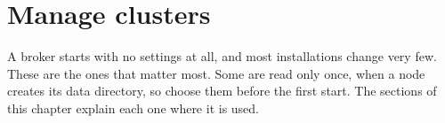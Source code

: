 
\chapter{Manage clusters}

A broker starts with no settings at all, and most installations change very few. These are the
ones that matter most. Some are read only once, when a node creates its data directory, so choose
them before the first start. The sections of this chapter explain each one where it is used.


